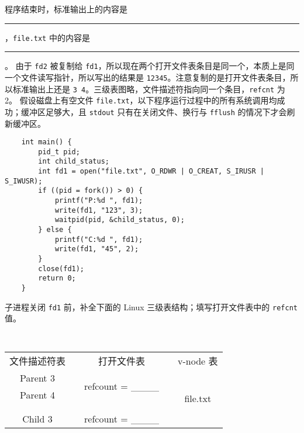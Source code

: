 \begin{problems}
\begin{table}[H]
\begin{tabular}{ccccc}
            \end{tabular}
        \end{table}
        \qn 程序结束时，标准输出上的内容是 \rule{2cm}{0.25mm}，\verb|file.txt| 中的内容是 \rule{2cm}{0.25mm}。
        \sol 由于 \verb|fd2| 被复制给 \verb|fd1|，所以现在两个打开文件表条目是同一个，本质上是同一个文件读写指针，所以写出的结果是 \verb|12345|。注意复制的是打开文件表条目，所以标准输出上还是 \verb|3 4|。三级表图略，文件描述符指向同一个条目，\verb|refcnt| 为 2。
        \pro 假设磁盘上有空文件 \verb|file.txt|，以下程序运行过程中的所有系统调用均成功；缓冲区足够大，且 \verb|stdout| 只有在关闭文件、换行与 \verb|fflush| 的情况下才会刷新缓冲区。
        \begin{verbatim}
    int main() {
        pid_t pid;
        int child_status;
        int fd1 = open("file.txt", O_RDWR | O_CREAT, S_IRUSR | S_IWUSR); 
        if ((pid = fork()) > 0) {
            printf("P:%d ", fd1);
            write(fd1, "123", 3);
            waitpid(pid, &child_status, 0);
        } else {
            printf("C:%d ", fd1);
            write(fd1, "45", 2);
        } 
        close(fd1);
        return 0;
    }
        \end{verbatim}
        \qn 子进程关闭 \verb|fd1| 前，补全下面的 Linux 三级表结构；填写打开文件表中的 \verb|refcnt| 值。
        \begin{table}[H]
            \tt
            \centering
            \begin{tabular}{ccccc}
                文件描述符表 & {\qquad \qquad \qquad} & 打开文件表 & {\qquad \qquad \qquad} & v-node 表 \\ \cline{1-1} \cline{3-3} \cline{5-5} 
                \multicolumn{1}{|c|}{Parent 3} & \multicolumn{1}{c|}{} & \multicolumn{1}{c|}{\multirow{2}{*}{refcount = \_\_\_\_}} & \multicolumn{1}{c|}{} & \multicolumn{1}{c|}{\multirow{6}{*}{file.txt}} \\ \cline{1-1}
                \multicolumn{1}{|c|}{Parent 4} & \multicolumn{1}{c|}{} & \multicolumn{1}{c|}{} & \multicolumn{1}{c|}{} & \multicolumn{1}{c|}{} \\ \cline{1-1} \cline{3-3}
                &  &  & \multicolumn{1}{c|}{} & \multicolumn{1}{c|}{} \\
                &  &  & \multicolumn{1}{c|}{} & \multicolumn{1}{c|}{} \\ \cline{1-1} \cline{3-3}
                \multicolumn{1}{|c|}{Child 3} & \multicolumn{1}{c|}{} & \multicolumn{1}{c|}{\multirow{2}{*}{refcount = \_\_\_\_}} & \multicolumn{1}{c|}{} & \multicolumn{1}{c|}{} \\ \cline{1-1}

\end{tabular}
\end{table}
\end{problems}
